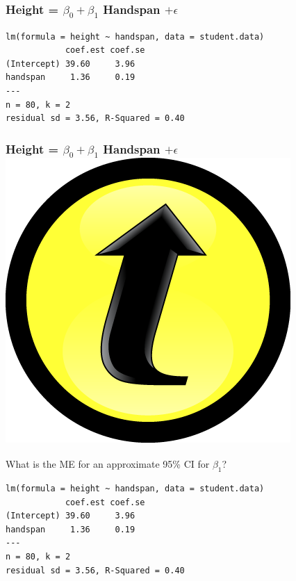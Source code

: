 \documentclass[handout]{beamer}
\begin{document}
\begin{frame}[fragile]
\frametitle{Height = $\beta_0 + \beta_1$ Handspan $+ \epsilon$}
\footnotesize
\begin{verbatim}
lm(formula = height ~ handspan, data = student.data)
            coef.est coef.se
(Intercept) 39.60     3.96  
handspan     1.36     0.19  
---
n = 80, k = 2
residual sd = 3.56, R-Squared = 0.40
\end{verbatim}

\end{frame}
\begin{frame}[fragile]
\frametitle{Height = $\beta_0 + \beta_1$ Handspan $+ \epsilon$ \hfill \includegraphics[scale = 0.05]{./images/clicker}}
\alert{What is the ME for an approximate 95\% CI for $\beta_1$?}
\footnotesize
\begin{verbatim}
lm(formula = height ~ handspan, data = student.data)
            coef.est coef.se
(Intercept) 39.60     3.96  
handspan     1.36     0.19  
---
n = 80, k = 2
residual sd = 3.56, R-Squared = 0.40
\end{verbatim}
\end{frame}
\end{document}

